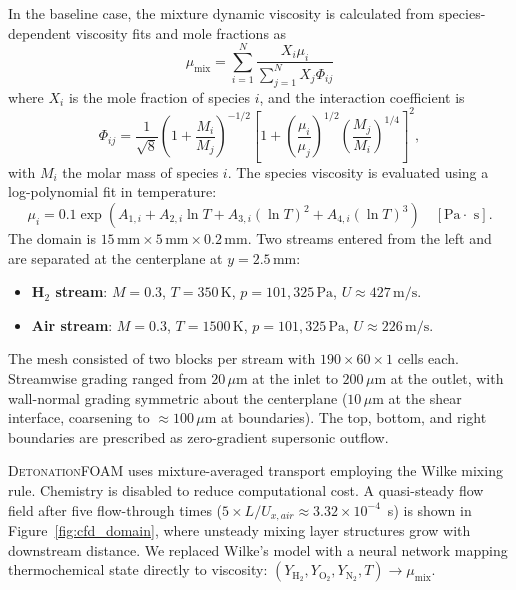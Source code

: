 \documentclass[preprint,12pt, a4paper]{elsarticle}
\begin{document}
In the baseline case, the mixture dynamic viscosity is calculated from species-dependent viscosity fits and mole fractions as
%
\begin{equation}
\mu_{\mathrm{mix}}
=
\sum_{i=1}^{N}
\frac{X_i \mu_i}
     {\sum_{j=1}^{N} X_j \Phi_{ij}}
\label{eq:wilke}
\end{equation}
%
where $X_i$ is the mole fraction of species $i$, and the interaction coefficient is
%
\begin{equation}
    \Phi_{ij} =
    \frac{1}{\sqrt{8}}
    \left(1 + \frac{M_i}{M_j}\right)^{-1/2}
    \left[
        1 +
        \left(\frac{\mu_i}{\mu_j}\right)^{1/2}
        \left(\frac{M_j}{M_i}\right)^{1/4}
    \right]^2,
    \label{eq:phi}
\end{equation}
%
with $M_i$ the molar mass of species $i$. The species viscosity is evaluated using a log-polynomial fit in temperature:
%
\begin{equation}
    \mu_i =
    0.1\exp\!\left(
        A_{1,i}
        + A_{2,i}\ln T
        + A_{3,i}(\ln T)^2
        + A_{4,i}(\ln T)^3
    \right)
    \quad [\text{Pa$\cdot$ s}].
    \label{eq:muspecies}
\end{equation}
%
The domain is $15\,\text{mm}\times5\,\text{mm}\times0.2\,\text{mm}$. Two streams entered from the left and are separated at the centerplane at $y=2.5\,\text{mm}$:
%
\begin{itemize}
    \item \textbf{H$_2$ stream}: $M=0.3$, $T=350\,\text{K}$, $p=101{,}325\,\text{Pa}$,
    $U\approx427\,\text{m/s}$.
    \item \textbf{Air stream}: $M=0.3$, $T=1500\,\text{K}$, $p=101{,}325\,\text{Pa}$,
    $U\approx226\,\text{m/s}$.
\end{itemize}

The mesh consisted of two blocks per stream with $190 \times 60 \times 1$ cells each. Streamwise grading ranged from $20\,\mu\text{m}$ at the inlet to $200\,\mu\text{m}$ at the outlet, with wall-normal grading symmetric about the centerplane ($10\,\mu\text{m}$ at the shear interface, coarsening to $\approx 100\,\mu\text{m}$ at boundaries). The top, bottom, and right boundaries are prescribed as zero-gradient supersonic outflow.


\textsc{DetonationFOAM} uses mixture-averaged transport employing the Wilke mixing rule. Chemistry is disabled to reduce computational cost. A quasi-steady flow field after five flow-through times ($5 \times L/U_{x,air}\approx 3.32 \times 10^{-4}$~s) is shown in Figure~\ref{fig:cfd_domain}, where unsteady mixing layer structures grow with downstream distance. We replaced Wilke's model with a neural network mapping thermochemical state directly to viscosity: $\left(Y_{\mathrm{H}_2},Y_{\mathrm{O}_2},Y_{\mathrm{N}_2},T\right)\rightarrow\mu_{\text{mix}}$.
\end{document}
